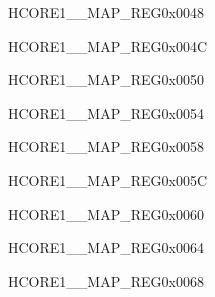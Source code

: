 \begin{register}{H}{CORE1\_\_MAP\_REG}{0x0048}\label{regdesc:CORE1LPSWINTMAPREG}
\end{register}\vspace{-3em}


\begin{register}{H}{CORE1\_\_MAP\_REG}{0x004C}\label{regdesc:CORE1LPSYSREGINTMAPREG}
\end{register}\vspace{-3em}


\begin{register}{H}{CORE1\_\_MAP\_REG}{0x0050}\label{regdesc:CORE1LPHUKINTMAPREG}
\end{register}\vspace{-3em}


\begin{register}{H}{CORE1\_\_MAP\_REG}{0x0054}\label{regdesc:CORE1SYSICMINTMAPREG}
\end{register}\vspace{-3em}


\begin{register}{H}{CORE1\_\_MAP\_REG}{0x0058}\label{regdesc:CORE1USBDEVICEINTMAPREG}
\end{register}\vspace{-3em}


\begin{register}{H}{CORE1\_\_MAP\_REG}{0x005C}\label{regdesc:CORE1SDIOHOSTINTMAPREG}
\end{register}\vspace{-3em}


\begin{register}{H}{CORE1\_\_MAP\_REG}{0x0060}\label{regdesc:CORE1AXIDMACINTMAPREG}
\end{register}\vspace{-3em}


\begin{register}{H}{CORE1\_\_MAP\_REG}{0x0064}\label{regdesc:CORE1SPI2INTMAPREG}
\end{register}\vspace{-3em}


\begin{register}{H}{CORE1\_\_MAP\_REG}{0x0068}\label{regdesc:CORE1SPI3INTMAPREG}
\end{register}\vspace{-3em}


